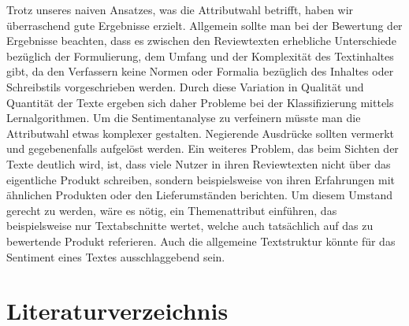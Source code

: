 \documentclass[a4paper]{article}
\begin{document}
Trotz unseres naiven Ansatzes, was die Attributwahl betrifft, haben wir überraschend gute Ergebnisse erzielt.\newline
Allgemein sollte man bei der Bewertung der Ergebnisse beachten, dass es zwischen den Reviewtexten erhebliche Unterschiede bezüglich der Formulierung, dem Umfang und der Komplexität des Textinhaltes gibt, da den Verfassern keine Normen oder Formalia bezüglich des Inhaltes oder Schreibstils vorgeschrieben werden. Durch diese Variation in Qualität und Quantität der Texte ergeben sich daher Probleme bei der Klassifizierung mittels Lernalgorithmen. 
Um die Sentimentanalyse zu verfeinern müsste man die Attributwahl etwas komplexer gestalten. Negierende Ausdrücke sollten vermerkt und gegebenenfalls aufgelöst werden.
Ein weiteres Problem, das beim Sichten der Texte deutlich wird, ist, dass viele Nutzer in ihren Reviewtexten nicht über das eigentliche Produkt schreiben, sondern beispielsweise von ihren Erfahrungen mit ähnlichen Produkten oder den Lieferumständen berichten.\newline
Um diesem Umstand gerecht zu werden, wäre es nötig, ein Themenattribut einführen, das beispielsweise nur Textabschnitte wertet, welche auch tatsächlich auf das zu bewertende Produkt referieren. Auch die allgemeine Textstruktur könnte für das Sentiment eines Textes ausschlaggebend sein.



\section{Literaturverzeichnis}



\printbibliography
\end{document}
